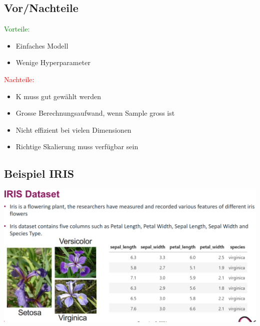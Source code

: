\subsection{Vor/Nachteile}
\textcolor{green}{Vorteile:}\\
\begin{itemize}
\item Einfaches Modell
\item Wenige Hyperparameter
\end{itemize}

\textcolor{red}{Nachteile:}
\begin{itemize}
\item K muss gut gewählt werden
\item Grosse Berechnungsaufwand, wenn Sample gross ist
\item Nicht effizient bei vielen Dimensionen
\item Richtige Skalierung muss verfügbar sein
\end{itemize}

\subsection{Beispiel IRIS}
\includegraphics[width=\linewidth]{img/iris.png}